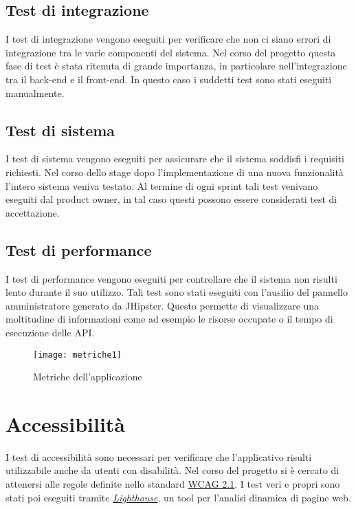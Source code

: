 \subsection{Test di integrazione}
I test di integrazione vengono eseguiti per verificare che non ci siano errori di integrazione tra le varie componenti del sistema. Nel corso del progetto questa fase di test è stata ritenuta di grande importanza, in particolare nell'integrazione tra il back-end e il front-end. In questo caso i suddetti test sono stati eseguiti manualmente. 

\subsection{Test di sistema}
I test di sistema vengono eseguiti per assicurare che il sistema soddisfi i requisiti richiesti. Nel corso dello stage dopo l'implementazione di una nuova funzionalità l'intero sistema veniva testato. Al termine di ogni sprint tali test venivano eseguiti dal product owner, in tal caso questi possono essere considerati test di accettazione.

\subsection{Test di performance}
I test di performance vengono eseguiti per controllare che il sistema non risulti lento durante il suo utilizzo. Tali test sono stati eseguiti con l'ausilio del pannello amministratore generato da JHipster. Questo permette di visualizzare una moltitudine di informazioni come ad esempio le risorse occupate o il tempo di esecuzione delle API.
\begin{figure}[h]
    \begin{center}
    \texttt{[image: metriche1]}
    \caption{Metriche dell'applicazione}
    \label{fig:figure31}
    \end{center}
\end{figure}

\section{Accessibilità}
I test di accessibilità sono necessari per verificare che l'applicativo risulti utilizzabile anche da utenti con disabilità. Nel corso del progetto si è cercato di attenersi alle regole definite nello standard \href{https://www.w3.org/TR/WCAG21/}{WCAG 2.1}. I test veri e propri sono stati poi eseguiti tramite \href{https://developers.google.com/web/tools/lighthouse/?utm_source=devtools}{\textit{Lighthouse}}, un tool per l'analisi dinamica di pagine web.
